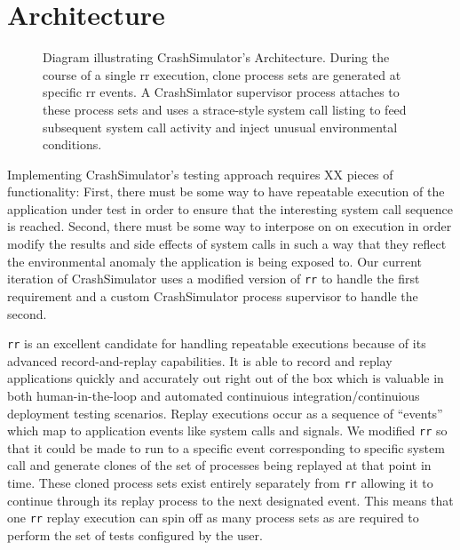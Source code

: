 \section{Architecture}
\label{SEC:architecture}

\begin{figure}[t]
  \center{}
  \caption{Diagram illustrating CrashSimulator's Architecture.  During the
    course of a single rr execution, clone process sets are generated at
    specific rr events.  A CrashSimlator supervisor process attaches to
    these process sets and uses a strace-style system call listing to feed
    subsequent system call activity and inject unusual environmental
    conditions.}
  \label{figure:approach}
\end{figure}

Implementing CrashSimulator's testing approach requires XX pieces of
functionality:  First, there must be some way to have
repeatable execution of the application under test in order to ensure that
the interesting system call sequence is reached.  Second, there must be
some way to interpose on on execution in order modify the results and side
effects of system calls in such a way that they reflect the environmental
anomaly the application is being exposed to.  Our current iteration of
CrashSimulator uses a modified version of {\tt rr} to handle the first
requirement and a custom CrashSimulator process supervisor to handle the
second.

{\tt rr} is an excellent candidate for handling repeatable executions
because of its advanced record-and-replay capabilities.  It is able to
record and replay applications quickly and accurately out right out of the
box which is valuable in both human-in-the-loop and automated
continuious integration/continuious deployment testing scenarios.  Replay
executions occur as a sequence of ``events'' which map to application
events like system calls and signals.  We modified {\tt rr} so that it
could be made to run to a specific event corresponding to specific system
call and generate clones of the set of processes being replayed at that
point in time.  These cloned process sets exist entirely separately from
{\tt rr} allowing it to continue through its replay process to the next
designated event.  This means that one {\tt rr} replay execution can spin
off as many process sets as are required to perform the set of tests
configured by the user.

